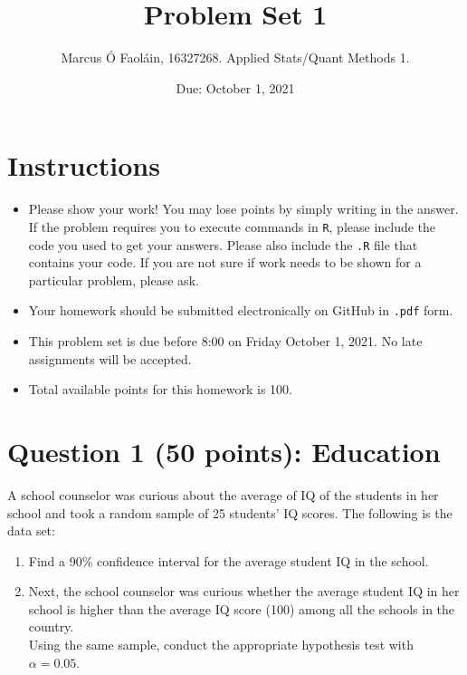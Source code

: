 \documentclass[12pt,letterpaper]{article}
\title{Problem Set 1}
\date{Due: October 1, 2021}
\author{ Marcus Ó Faoláin, 16327268. Applied Stats/Quant Methods 1.}
\begin{document}
	\maketitle
	
	\section*{Instructions}
	\begin{itemize}
		\item Please show your work! You may lose points by simply writing in the answer. If the problem requires you to execute commands in \texttt{R}, please include the code you used to get your answers. Please also include the \texttt{.R} file that contains your code. If you are not sure if work needs to be shown for a particular problem, please ask.
		\item Your homework should be submitted electronically on GitHub in \texttt{.pdf} form.
		\item This problem set is due before 8:00 on Friday October 1, 2021. No late assignments will be accepted.
		\item Total available points for this homework is 100.
	\end{itemize}
	
	\vspace{1cm}
	\section*{Question 1 (50 points): Education}

A school counselor was curious about the average of IQ of the students in her school and took a random sample of 25 students' IQ scores. The following is the data set:\\
\vspace{.5cm}

  

\vspace{1cm}

\begin{enumerate}
	\item Find a 90\% confidence interval for the average student IQ in the school.\\
	
	\item Next, the school counselor was curious  whether  the average student IQ in her school is higher than the average IQ score (100) among all the schools in the country.\\ 
	
	\noindent Using the same sample, conduct the appropriate hypothesis test with $\alpha=0.05$.
\end{enumerate}
\end{document}
